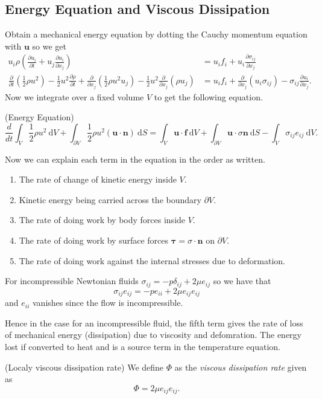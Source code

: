 \documentclass{article}
\begin{document}
 \subsection{Energy Equation and Viscous Dissipation}
Obtain a mechanical energy equation by dotting the Cauchy momentum equation with $ \mathbf u $ so we get
\begin{align*}
	u_i \rho\left(\frac{\partial u_i}{\partial t} + u_j \frac{\partial u_i}{\partial x_j}\right) &= u_if_i + u_i\frac{\partial \sigma_{ij}}{\partial x_j} \\
	\frac \partial{\partial t} \left(\frac 12 \rho u^2\right) - \frac 12 u^2 \frac{\partial \rho}{\partial t}+ \frac\partial{\partial x_j} \left(\frac 12 \rho u^2  u_j\right) - \frac 12 u^2 \frac{\partial}{\partial x_j}(\rho u_j) &= u_if_i +\frac{\partial}{\partial x_j}(u_i\sigma_{ij}) - \sigma_{ij}\frac{\partial u_i}{\partial x_j}.
\end{align*}
Now we integrate over a fixed volume $ V $ to get the following equation.
\begin{definition}
	(Energy Equation)
	\[
		\frac d{dt} \int_V \frac 12 \rho u^2\  \mathrm dV + \int_{\partial V} \frac 12 \rho u^2(\mathbf u \cdot\mathbf n) \ \mathrm dS = \int_V \mathbf u\cdot\mathbf f\  \mathrm dV + \int_{\partial V}\mathbf u \cdot \sigma \mathbf n \ \mathrm dS - \int_V \sigma_{ij}e_{ij}\ \mathrm dV.
	\]
\end{definition}
Now we can explain each term in the equation in the order as written.
\begin{enumerate}
	\item The rate of change of kinetic energy inside $ V $.
	\item Kinetic energy being carried across the boundary $ \partial V $.
	\item The rate of doing work by body forces inside $ V $.
	\item The rate of doing work by surface forces $ \boldsymbol \tau = \sigma \cdot\mathbf n $ on $ \partial V $.
	\item The rate of doing work against the internal stresses due to deformation.
\end{enumerate}
For incompressible Newtonian fluids $ \sigma_{ij} = -p \delta_{ij} + 2\mu e_{ij} $ so we have that
\[
	\sigma_{ij}e_{ij} = -p e_{ii} + 2\mu e_{ij}e_{ij}
\]
and $ e_{ii} $ vanishes since the flow is incompressible.\par
Hence in the case for an incompressible fluid, the fifth term gives the rate of loss of mechanical energy (dissipation) due to viscosity and defomration. The energy lost if converted to heat and is a source term in the temperature equation.
\begin{definition}
	(Localy viscous dissipation rate) We define $ \Phi $ as the \textit{viscous dissipation rate} given as
	\[
		\Phi = 2\mu e_{ij}e_{ij}.
	\]
\end{definition}
\end{document}

